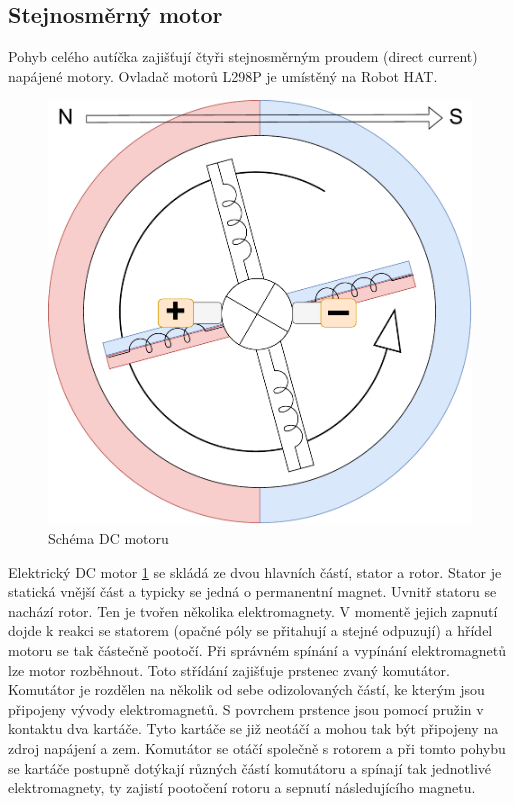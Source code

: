\subsection*{Stejnosměrný motor}
Pohyb celého autíčka zajišťují čtyři stejnosměrným proudem (direct current) napájené motory. Ovladač motorů L298P je umístěný na Robot HAT.

\begin{figure}[h!]
	\centering
	\includegraphics[scale=0.5]{obrazky-figures/dc_motor.pdf}
	\caption{Schéma DC motoru}
	\label{fig:dc_motor}
\end{figure}

Elektrický DC motor \ref{fig:dc_motor} se skládá ze dvou hlavních částí, stator a rotor. Stator je statická vnější část a typicky se jedná o permanentní magnet. Uvnitř statoru se nachází rotor. Ten je tvořen několika elektromagnety. V momentě jejich zapnutí dojde k reakci se statorem (opačné póly se přitahují a stejné odpuzují) a hřídel motoru se tak částečně pootočí. Při správném spínání a vypínání elektromagnetů lze motor rozběhnout.
Toto střídání zajišťuje prstenec zvaný komutátor. Komutátor je rozdělen na několik od sebe odizolovaných částí, ke kterým jsou připojeny vývody elektromagnetů. S povrchem prstence jsou pomocí pružin v kontaktu dva kartáče. Tyto kartáče se již neotáčí a mohou tak být připojeny na zdroj napájení a zem. Komutátor se otáčí společně s rotorem a při tomto pohybu se kartáče postupně dotýkají různých částí komutátoru a spínají tak jednotlivé elektromagnety, ty zajistí pootočení rotoru a sepnutí následujícího magnetu. \cite[std:~28-36]{mobilní_roboty}

